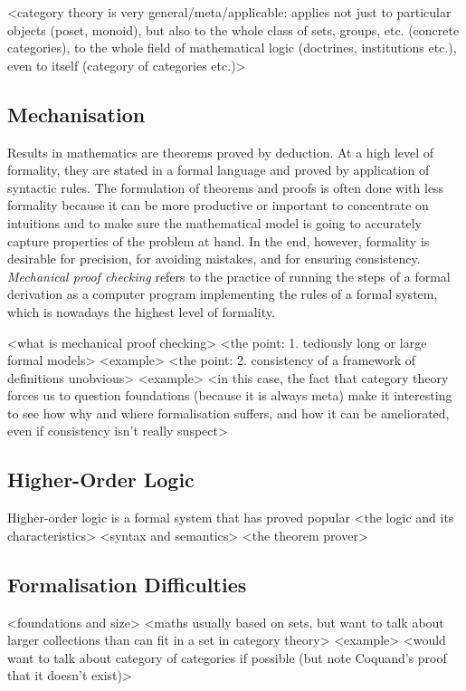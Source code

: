 \documentclass[twoside,titlepage,11pt]{article}
\begin{document}
<category theory is very general/meta/applicable: applies not just to particular objects (poset, monoid), but also to the whole class of sets, groups, etc. (concrete categories), to the whole field of mathematical logic (doctrines, institutions etc.), even to itself (category of categories etc.)>%
\subsection{Mechanisation}%
Results in mathematics are theorems proved by deduction.
At a high level of formality, they are stated in a formal language and proved by application of syntactic rules.
The formulation of theorems and proofs is often done with less formality because it can be more productive or important to concentrate on intuitions and to make sure the mathematical model is going to accurately capture properties of the problem at hand.
In the end, however, formality is desirable for precision, for avoiding mistakes, and for ensuring consistency.
\emph{Mechanical proof checking} refers to the practice of running the steps of a formal derivation as a computer program implementing the rules of a formal system, which is nowadays the highest level of formality.%

<what is mechanical proof checking>%
<the point: 1. tediously long or large formal models>%
  <example>
<the point: 2. consistency of a framework of definitions unobvious>%
  <example>
<in this case, the fact that category theory forces us to question foundations (because it is always meta) make it interesting to see how why and where formalisation suffers, and how it can be ameliorated, even if consistency isn't really suspect>%
\subsection{Higher-Order Logic}%
Higher-order logic is a formal system that has proved popular
<the logic and its characteristics>%
<syntax and semantics>%
<the theorem prover>%
\subsection{Formalisation Difficulties}%
<foundations and size>%
  <maths usually based on sets, but want to talk about larger collections than can fit in a set in category theory>
  <example>
  <would want to talk about category of categories if possible (but note Coquand's proof that it doesn't exist)>
\end{document}
